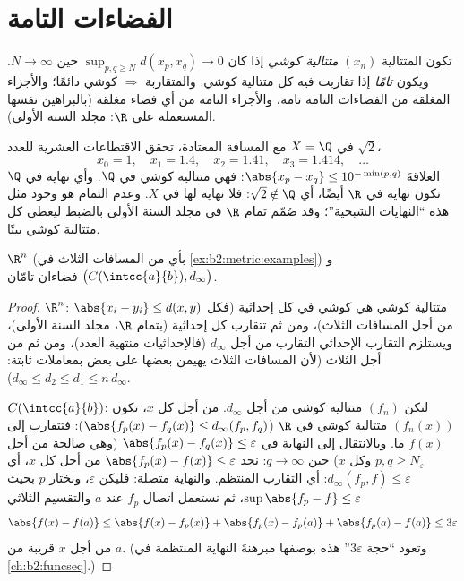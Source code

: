 \section{الفضاءات التامة}

\begin{definition}\label{def:b2:metric:complete}
تكون المتتالية $(x_n)$ \emph{متتالية كوشي} إذا كان $\sup_{p, q \geq N} d(x_p,
x_q) \to 0$ حين $N \to \infty$. ويكون 
\emph{تامًا} إذا تقاربت فيه كل متتالية
كوشي. والمتقاربة $\Rightarrow$ كوشي دائمًا؛ والأجزاء المغلقة
من الفضاءات التامة تامة، والأجزاء التامة من أي فضاء
مغلقة (بالبراهين نفسها المستعملة على $\R$: مجلد السنة الأولى).
\end{definition}

\begin{example}\label{ex:b2:metric:cauchynolimit}
في $X = \Q$ مع المسافة المعتادة، تحقق الاقتطاعات العشرية للعدد
$\sqrt2$،
\[
x_0 = 1,\quad x_1 = 1.4,\quad x_2 = 1.41,\quad x_3 = 1.414,
\quad\dots
\]
العلاقةَ $\abs{x_p - x_q} \leq 10^{-\min(p,q)}$: فهي متتالية كوشي في $\Q$.
وأي نهاية في $\Q$ تكون نهاية في $\R$ أيضًا، أي
$\sqrt2 \notin \Q$: فلا نهاية لها في $X$. وعدم التمام هو
وجود مثل هذه ``النهايات الشبحية''؛ وقد صُمّم تمام $\R$
في مجلد السنة الأولى بالضبط ليعطي كل متتالية كوشي بيتًا.
\end{example}

\begin{theorem}\label{thm:b2:metric:rncomplete}
$\R^n$ (بأي من المسافات الثلاث في
\cref{ex:b2:metric:examples}) و$\bigl(C(\intcc{a}{b}),
d_\infty\bigr)$ فضاءان تامّان.
\end{theorem}

\begin{proof}
$\R^n$: متتالية كوشي هي كوشي في كل إحداثية (فكل
$\abs{x_i - y_i} \leq d(x,y)$ من أجل المسافات الثلاث)، ومن ثم تتقارب كل
إحداثية (بتمام $\R$، مجلد السنة الأولى)، ويستلزم
التقارب الإحداثي التقارب من أجل $d_\infty$
(فالإحداثيات منتهية العدد)، ومن ثم من أجل الثلاث (لأن المسافات
الثلاث يهيمن بعضها على بعض بمعاملات ثابتة: $d_\infty
\leq d_2 \leq d_1 \leq n\,d_\infty$).

$C(\intcc{a}{b})$: لتكن $(f_n)$ متتالية كوشي من أجل $d_\infty$. من أجل كل $x$،
تكون $(f_n(x))$ متتالية كوشي في $\R$ ($\abs{f_p(x) - f_q(x)} \leq
d_\infty(f_p, f_q)$): فتتقارب إلى $f(x)$ ما. وبالانتقال إلى
النهاية في $\abs{f_p(x) - f_q(x)} \leq \varepsilon$ (وهي صالحة من أجل $p, q
\geq N_\varepsilon$ وكل $x$) حين $q \to \infty$: نجد $\abs{f_p(x) -
f(x)} \leq \varepsilon$ من أجل كل $x$، أي $d_\infty(f_p, f) \leq
\varepsilon$: أي التقارب المنتظم. والنهاية متصلة: فليكن
$\varepsilon$، ونختار $p$ بحيث $\sup\abs{f_p - f} \leq \varepsilon$،
ثم نستعمل اتصال $f_p$ عند $a$ والتقسيم الثلاثي
\[
\abs{f(x) - f(a)} \leq \abs{f(x) - f_p(x)} + \abs{f_p(x) - f_p(a)}
+ \abs{f_p(a) - f(a)} \leq 3\varepsilon
\]
من أجل $x$ قريبة من $a$. (وتعود ``حجة $3\varepsilon$'' هذه بوصفها
مبرهنةَ النهاية المنتظمة في \cref{ch:b2:funcseq}.)
\end{proof}

